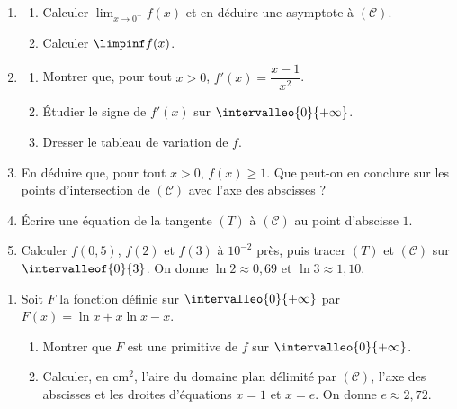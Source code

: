 \begin{devoirsurveille}
\begin{enumerate}[label=\textbf{\arabic*.}, leftmargin=*, itemsep=0.25em]
  \item \begin{enumerate}[label=\textbf{\alph*)}, leftmargin=1.4em, itemsep=0.15em]
      \item Calculer $\displaystyle\lim_{x \to 0^{+}} f(x)$ et en déduire
            une asymptote à $(\mathcal C)$. 
      \item Calculer $\limpinf f(x)$. 
    \end{enumerate}
  \item \begin{enumerate}[label=\textbf{\alph*)}, leftmargin=1.4em, itemsep=0.15em]
      \item Montrer que, pour tout $x>0$,
            $f'(x) = \dfrac{x-1}{x^{2}}$. 
      \item Étudier le signe de $f'(x)$ sur $\intervalleo{0}{+\infty}$.
      \item Dresser le tableau de variation de $f$. 
    \end{enumerate}
  \item En déduire que, pour tout $x>0$, $f(x) \geq 1$. Que peut-on en
        conclure sur les points d'intersection de $(\mathcal C)$ avec l'axe
        des abscisses ? 
  \item Écrire une équation de la tangente $(T)$ à $(\mathcal C)$ au point
        d'abscisse $1$. 
  \item Calculer $f(0{,}5)$, $f(2)$ et $f(3)$ à $10^{-2}$ près, puis tracer
        $(T)$ et $(\mathcal C)$ sur $\intervalleof{0}{3}$. On donne
        $\ln 2 \approx 0{,}69$ et $\ln 3 \approx 1{,}10$.
\end{enumerate}

\begin{enumerate}[label=\textbf{\arabic*.}, leftmargin=*, itemsep=0.25em, start=6]
  \item Soit $F$ la fonction définie sur $\intervalleo{0}{+\infty}$ par
        $F(x) = \ln x+x\ln x-x$.
    \begin{enumerate}[label=\textbf{\alph*)}, leftmargin=1.4em, itemsep=0.15em]
      \item Montrer que $F$ est une primitive de $f$ sur
            $\intervalleo{0}{+\infty}$. 
      \item Calculer, en $\text{cm}^{2}$, l'aire du domaine plan délimité
            par $(\mathcal C)$, l'axe des abscisses et les droites
            d'équations $x = 1$ et $x = e$. On donne $e \approx 2{,}72$.
    \end{enumerate}
\end{enumerate}
\end{devoirsurveille}

